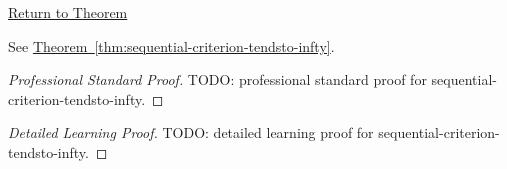 \newpage
{}
\label{prf:sequential-criterion-tendsto-infty}

\begin{remark*}[Return]
\hyperref[thm:sequential-criterion-tendsto-infty]{Return to Theorem}
\end{remark*}

\begin{theorem*}
See \hyperref[thm:sequential-criterion-tendsto-infty]{Theorem~\ref*{thm:sequential-criterion-tendsto-infty}}.
\end{theorem*}

\begin{proof}[Professional Standard Proof]
\LRAProofBodyStart
TODO: professional standard proof for sequential-criterion-tendsto-infty.
\end{proof}

\begin{proof}[Detailed Learning Proof]
\LRAProofBodyStart
TODO: detailed learning proof for sequential-criterion-tendsto-infty.
\end{proof}

\begin{remark*}
\end{remark*}

\begin{dependencies}
\NoLocalDependencies
\end{dependencies}

\clearpage

